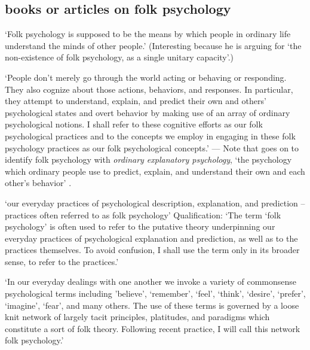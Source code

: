 \documentclass[12pt,\papersize]{extarticle}
\begin{document}
\hypertarget{books-or-articles-on-folk-psychology}{%
\subsection{books or articles on folk psychology}\label{books-or-articles-on-folk-psychology}}

`Folk psychology is supposed to be the means by which people in ordinary life understand the minds of other people.' \citep[p.~211]{morton:2007_folk} (Interesting because he is arguing for `the non-existence of folk psychology, as a single unitary capacity'.)

`People don't merely go through the world acting or behaving or responding. They also cognize about those actions, behaviors, and responses. In particular, they attempt to understand, explain, and predict their own and others' psychological states and overt behavior by making use of an array of ordinary psychological notions. I shall refer to these cognitive efforts as our folk psychological practices and to the concepts we employ in engaging in these folk psychology practices as our folk psychological concepts.' \citep[p.~24]{voneckardt:1997_empirical} --- Note that \citet[footnote 3, p.~29]{voneckardt:1997_empirical} goes on to identify folk psychology with \emph{ordinary explanatory psychology}, `the psychology which ordinary people use to predict, explain, and understand their own and each other's behavior' \citep[p.~28]{voneckardt:1997_empirical}.

`our everyday practices of psychological description, explanation, and prediction -- practices often referred to as folk psychology' \citep[p.~1]{frankish:2007_mind} Qualification: `The term `folk psychology' is often used to refer to the putative theory underpinning our everyday practices of psychological explanation and prediction, as well as to the practices themselves. To avoid confusion, I shall use the term only in its broader sense, to refer to the practices.' \citep[footnote 1p.~1]{frankish:2007_mind}

`In our everyday dealings with one another we invoke a variety of commonsense psychological terms including 'believe', `remember', `feel', `think', `desire', `prefer', `imagine', `fear', and many others. The use of these terms is governed by a loose knit network of largely tacit principles, platitudes, and paradigms which constitute a sort of folk theory. Following recent practice, I will call this network folk psychology.' \citep[p.~1]{stich:1983_folk}
\end{document}
